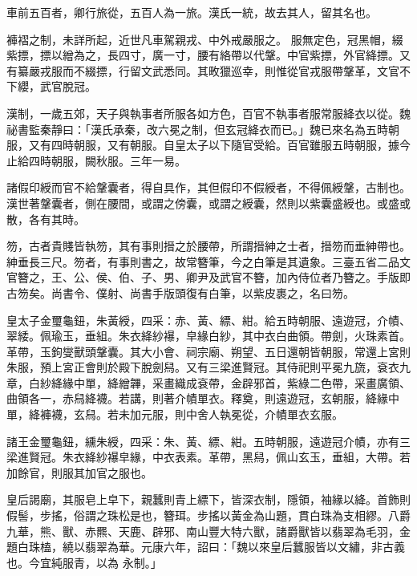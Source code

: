 \begin{pinyinscope}
 車前五百者，卿行旅從，五百人為一旅。漢氏一統，故去其人，留其名也。



 褲褶之制，未詳所起，近世凡車駕親戎、中外戒嚴服之。
 服無定色，冠黑帽，綴紫摽，摽以繒為之，長四寸，廣一寸，腰有絡帶以代鞶。中官紫摽，外官絳摽。又有纂嚴戎服而不綴摽，行留文武悉同。其畋獵巡幸，則惟從官戎服帶鞶革，文官不下纓，武官脫冠。



 漢制，一歲五郊，天子與執事者所服各如方色，百官不執事者服常服絳衣以從。魏祕書監秦靜曰：「漢氏承秦，改六冕之制，但玄冠絳衣而已。」魏已來名為五時朝服，又有四時朝服，又有朝服。自皇太子以下隨官受給。百官雖服五時朝服，據今止給四時朝服，闕秋服。三年一易。



 諸假印綬而官不給鞶囊者，得自具作，其但假印不假綬者，不得佩綬鞶，古制也。漢世著鞶囊者，側在腰間，或謂之傍囊，或謂之綬囊，然則以紫囊盛綬也。或盛或散，各有其時。



 笏，古者貴賤皆執笏，其有事則搢之於腰帶，所謂搢紳之士者，搢笏而垂紳帶也。紳垂長三尺。笏者，有事則書之，故常簪筆，今之白筆是其遺象。三臺五省二品文官簪之，王、公、侯、伯、子、男、卿尹及武官不簪，加內侍位者乃簪之。手版即古笏矣。尚書令、僕射、尚書手版頭復有白筆，以紫皮裹之，名曰笏。



 皇太子金璽龜鈕，朱黃綬，四采：赤、黃、縹、紺。給五時朝服、遠遊冠，介幘、翠緌。佩瑜玉，垂組。朱衣絳紗襮，皁緣白紗，其中衣白曲領。帶劍，火珠素首。革帶，玉鉤燮獸頭鞶囊。其大小會、祠宗廟、朔望、五日還朝皆朝服，常還上宮則朱服，預上宮正會則於殿下脫劍舄。又有三梁進賢冠。其侍祀則平冕九旒，袞衣九章，白紗絳緣中單，絳繒韠，采畫織成袞帶，金辟邪首，紫綠二色帶，采畫廣領、曲領各一，赤舄絳襪。若講，則著介幘單衣。釋奠，則遠遊冠，玄朝服，絳緣中單，絳褲襪，玄舄。若未加元服，則中舍人執冕從，介幘單衣玄服。



 諸王金璽龜鈕，纁朱綬，四采：朱、黃、縹、紺。五時朝服，遠遊冠介幘，亦有三梁進賢冠。朱衣絳紗襮皁緣，中衣表素。革帶，黑舄，佩山玄玉，垂組，大帶。若加餘官，則服其加官之服也。



 皇后謁廟，其服皂上皁下，親蠶則青上縹下，皆深衣制，隱領，袖緣以絳。首飾則假髻，步搖，俗謂之珠松是也，簪珥。步搖以黃金為山題，貫白珠為支相繆。八爵九華，熊、獸、赤羆、天鹿、辟邪、南山豐大特六獸，諸爵獸皆以翡翠為毛羽，金題白珠榼，繞以翡翠為華。元康六年，詔曰：「魏以來皇后蠶服皆以文繡，非古義也。今宜純服青，以為
 永制。」




\end{pinyinscope}
